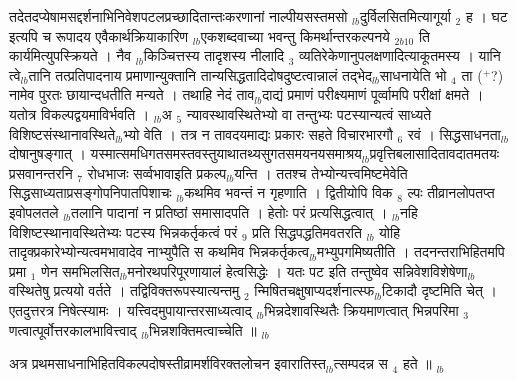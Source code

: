 \documentclass[article,12pt,a4paper]{memoir}%
\newcommand{\add}[1]{($^{+}$#1)}
\newcounter{parCount}
\begin{document}
	  
	  \pstart \leavevmode%
	तदेतदप्येषामसद्दर्शनाभिनिवेशपटलप्रच्छादितान्तःकरणानां नाल्पीयसस्तमसो {\tiny $_{lb}$}दुर्विलसितमित्यागूर्या {\tiny $_{2}$} ह । {\color{DodgerBlue3}घट इत्यपि च रूपादय एवैकार्थक्रियाकारिण {\tiny $_{lb}$}एकशब्दवाच्या भवन्तु किमर्थान्तरकल्पनये} {\tiny $_{2b10}$} ति कार्यमित्युपस्क्रियते । नैव {\tiny $_{lb}$}किञ्चित्तस्य तादृशस्य नीलादि {\tiny $_{3}$} व्यतिरेकेणानुपलक्षणादित्याकूतमस्य । यानि त्वे{\tiny $_{lb}$}तानि तत्प्रतिपादनाय प्रमाणान्युक्तानि तान्यसिद्धतादिदोषदुष्टत्वान्नालं तद्भेद{\tiny $_{lb}$}साधनायेति भो {\tiny $_{4}$} ता \add{?} नामेव पुरतः छायान्दधतीति मन्यते । तथाहि नेदं ताव{\tiny $_{lb}$}दाद्यं प्रमाणं परीक्ष्यमाणं पूर्व्वामपि परीक्षां क्षमते । यतोत्र विकल्पद्वयमाविर्भवति । {\tiny $_{lb}$}अ {\tiny $_{5}$} न्यावस्थावस्थितेभ्यो वा तन्तुभ्यः पटस्यान्यत्वं साध्यते विशिष्टसंस्थानावस्थिते{\tiny $_{lb}$}भ्यो वेति । तत्र न तावदयमाद्यः प्रकारः सहते विचारभारगौ {\tiny $_{6}$} रवं । सिद्धसाधनता{\tiny $_{lb}$}दोषानुषङ्गात् । यस्मात्समधिगतसमस्तवस्तुयाथातथ्यसुगतसमयनयसमाश्रय{\tiny $_{lb}$}प्रवृत्तिबलासादितावदातमतयः प्रसवानन्तरनि {\tiny $_{7}$} रोधभाजः सर्व्वभावाइति प्रकल्प{\tiny $_{lb}$}यन्ति । ततश्च तेभ्योन्यत्त्वमिष्टमेवेति सिद्धसाध्यताप्रसङ्गोपनिपातपिशाचः {\tiny $_{lb}$}कथमिव भवन्तं न गृहणाति । द्वितीयोपि विक {\tiny $_{8}$} ल्पः तीव्रानलोपतप्त इवोपलतले {\tiny $_{lb}$}तलानि पादानां न प्रतिष्ठां समासादपति । हेतोः परं प्रत्यसिद्धत्वात् । {\tiny $_{lb}$}नहि विशिष्टस्थानावस्थितेभ्यः पटस्य भिन्नकर्तृकत्वं परं {\tiny $_{9}$} \leavevmode{} प्रति सिद्धपद्धतिमवतरति {\tiny $_{lb}$} \leavevmode{} योहि तादृक्प्रकारेभ्योन्यत्वमभावादेव नाभ्युपैति स कथमिव भिन्नकर्तृकत्व{\tiny $_{lb}$}मभ्युपगमिष्यतीति । तदनन्तराभिहितमपि प्रमा {\tiny $_{1}$} णेन समभिलसित{\tiny $_{lb}$}मनोरथपरिपूरणायालं हेत्वसिद्धेः । यतः पट इति तन्तुष्वेव सन्निवेशविशेषेणा{\tiny $_{lb}$}वस्थितेषु प्रत्ययो वर्तते । तद्विविक्तरूपस्यात्यन्तमु {\tiny $_{2}$} न्मिषितचक्षुषाप्यदर्शनात्स्फ{\tiny $_{lb}$}टिकादौ दृष्टमिति चेत् । एतदुत्तरत्र निषेत्स्यामः । यत्त्विदमुपायान्तरसाध्यत्वाद् {\tiny $_{lb}$}भिन्नदेशावस्थितैः क्रियमाणत्वात् भिन्नपरिमा {\tiny $_{3}$} णत्वात्पूर्वोत्तरकालभावित्त्वाद् {\tiny $_{lb}$}भिन्नशक्तिमत्वाच्चेति ॥
	{}
	\pend%
      {\tiny $_{lb}$}

	  
	  \pstart \leavevmode%
	अत्र प्रथमसाधनाभिहितविकल्पदोषस्तीव्रामर्शविरक्तलोचन इवारातिस्त{\tiny $_{lb}$}त्सम्पदन्न स {\tiny $_{4}$} हते ॥
	{}
	\pend%
      {\tiny $_{lb}$}
	  \bigskip
	  \begingroup
	
\end{document}
